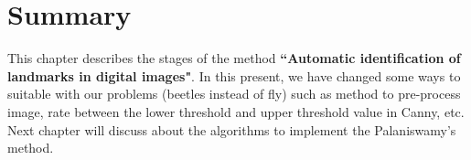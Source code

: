 \section{Summary}
This chapter describes the stages of the method \textbf{``Automatic identification of landmarks in digital images"}. In this present, we have changed some ways to suitable with our problems (beetles instead of fly) such as method to pre-process image, rate between the lower threshold and upper threshold value in Canny, etc. Next chapter will discuss about the algorithms to implement the Palaniswamy's method.